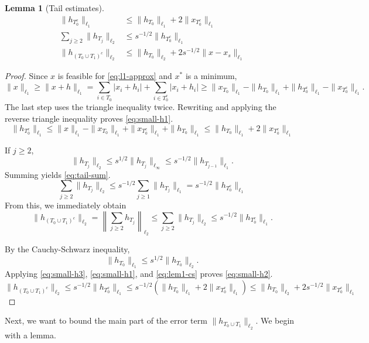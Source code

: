 \documentclass{article}
\newtheorem{lemma}[theorem]{Lemma}
\theoremstyle{definition}
\begin{document}
\begin{lemma}[Tail estimates]\label{lem:tail-estimate}
\begin{align}\label{eq:small-h1}
\|h_{T_0^c}\|_{\ell_1} &\leq \|h_{T_0}\|_{\ell_1} + 2\|x_{T_0^c}\|_{\ell_1}
\\
\label{eq:tail-sum}
\sum_{j \geq 2}\|h_{T_j}\|_{\ell_2} &\leq s^{-1/2}\|h_{T_0^c}\|_{\ell_1} \\
\label{eq:small-h2}
\|h_{(T_0\cup T_1)^c}\|_{\ell_2} &\leq \|h_{T_0}\|_{\ell_2} + 2s^{-1/2}\|x - x_s\|_{\ell_1}
\end{align}
\end{lemma}
\begin{proof}
Since $x$ is feasible for \eqref{eq:l1-approx} and $x^*$ is a minimum,
$$
\|x\|_{\ell_1} \geq \|x + h\|_{\ell_1} = \sum_{i \in T_0}|x_i + h_i| + \sum_{i \in T_0^c}|x_i + h_i| \geq \|x_{T_0}\|_{\ell_1} - \|h_{T_0}\|_{\ell_1} + \|h_{T_0^c}\|_{\ell_1} - \|x_{T_0^c}\|_{\ell_1}.
$$
The last step uses the triangle inequality twice. Rewriting and applying the reverse triangle inequality proves \eqref{eq:small-h1}.
$$
\|h_{T_0^c}\|_{\ell_1} \leq \|x\|_{\ell_1} - \|x_{T_0}\|_{\ell_1} + \|x_{T_0^c}\|_{\ell_1} + \|h_{T_0}\|_{\ell_1} \leq \|h_{T_0}\|_{\ell_1} + 2\|x_{T_0^c}\|_{\ell_1}
$$

If $j \geq 2$,
$$
\|h_{T_j}\|_{\ell_2} \leq s^{1/2}\|h_{T_j}\|_{\ell_\infty} \leq s^{-1/2}\|h_{T_{j - 1}}\|_{\ell_1}.
$$
Summing yields \eqref{eq:tail-sum}.
$$
\sum_{j \geq 2}\|h_{T_j}\|_{\ell_2} \leq s^{-1/2}\sum_{j \geq 1}\|h_{T_j}\|_{\ell_1}= s^{-1/2}\|h_{T_0^c}\|_{\ell_1}
$$
From this, we immediately obtain
\begin{equation}\label{eq:small-h3}
\|h_{(T_0\cup T_1)^c}\|_{\ell_2} = \left\|\sum_{j \geq 2}h_{T_j}\right\|_{\ell_2} \leq \sum_{j \geq 2}\|h_{T_j}\|_{\ell_2} \leq s^{-1/2}\|h_{T_0^c}\|_{\ell_1}.
\end{equation}

By the Cauchy-Schwarz inequality,
\begin{equation}\label{eq:lem1-cs}
\|h_{T_0}\|_{\ell_1} \leq s^{1/2}\|h_{T_0}\|_{\ell_2}.
\end{equation}
Applying \eqref{eq:small-h3}, \eqref{eq:small-h1}, and \eqref{eq:lem1-cs} proves \eqref{eq:small-h2}.
$$
\|h_{(T_0\cup T_1)^c}\|_{\ell_2} \leq s^{-1/2}\|h_{T_0^c}\|_{\ell_1} \leq s^{-1/2}(\|h_{T_0}\|_{\ell_1} + 2\|x_{T_0^c}\|_{\ell_1}) \leq \|h_{T_0}\|_{\ell_2} + 2s^{-1/2}\|x_{T_0^c}\|_{\ell_1}
$$
\end{proof}

Next, we want to bound the main part of the error term $\|h_{T_0\cup T_1}\|_{\ell_2}$. We begin with a lemma.
\end{document}
